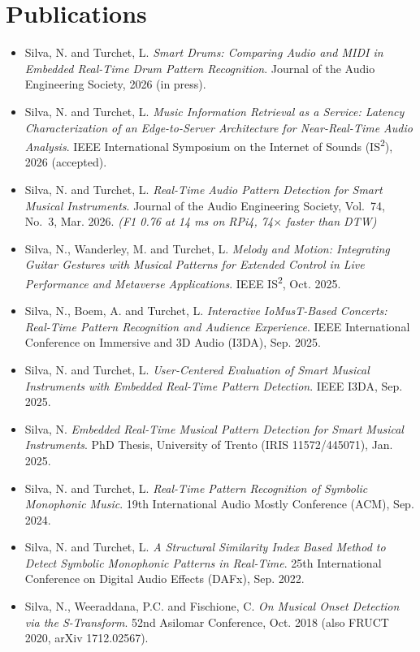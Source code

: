 \documentclass[11pt]{article}
\begin{document}
\section*{Publications \footnotesize {}}
\begin{itemize}[leftmargin=1.2em, itemsep=-0.2em]
    \item Silva, N. and Turchet, L. \textit{Smart Drums: Comparing Audio and MIDI in Embedded Real-Time Drum Pattern Recognition}. Journal of the Audio Engineering Society, 2026 (in press).
    \item Silva, N. and Turchet, L. \textit{Music Information Retrieval as a Service: Latency Characterization of an Edge-to-Server Architecture for Near-Real-Time Audio Analysis}. IEEE International Symposium on the Internet of Sounds (IS\textsuperscript{2}), 2026 (accepted).
    \item Silva, N. and Turchet, L. \textit{Real-Time Audio Pattern Detection for Smart Musical Instruments}. Journal of the Audio Engineering Society, Vol.~74, No.~3, Mar. 2026. \textit{(F1 0.76 at 14 ms on RPi4, 74$\times$ faster than DTW)}
    \item Silva, N., Wanderley, M. and Turchet, L. \textit{Melody and Motion: Integrating Guitar Gestures with Musical Patterns for Extended Control in Live Performance and Metaverse Applications}. IEEE IS\textsuperscript{2}, Oct. 2025.
    \item Silva, N., Boem, A. and Turchet, L. \textit{Interactive IoMusT-Based Concerts: Real-Time Pattern Recognition and Audience Experience}. IEEE International Conference on Immersive and 3D Audio (I3DA), Sep. 2025.
    \item Silva, N. and Turchet, L. \textit{User-Centered Evaluation of Smart Musical Instruments with Embedded Real-Time Pattern Detection}. IEEE I3DA, Sep. 2025.
    \item Silva, N. \textit{Embedded Real-Time Musical Pattern Detection for Smart Musical Instruments}. PhD Thesis, University of Trento (IRIS 11572/445071), Jan. 2025.
    \item Silva, N. and Turchet, L. \textit{Real-Time Pattern Recognition of Symbolic Monophonic Music}. 19th International Audio Mostly Conference (ACM), Sep. 2024.
    \item Silva, N. and Turchet, L. \textit{A Structural Similarity Index Based Method to Detect Symbolic Monophonic Patterns in Real-Time}. 25th International Conference on Digital Audio Effects (DAFx), Sep. 2022.
    \item Silva, N., Weeraddana, P.C. and Fischione, C. \textit{On Musical Onset Detection via the S-Transform}. 52nd Asilomar Conference, Oct. 2018 (also FRUCT 2020, arXiv 1712.02567).
\end{itemize}
\end{document}
